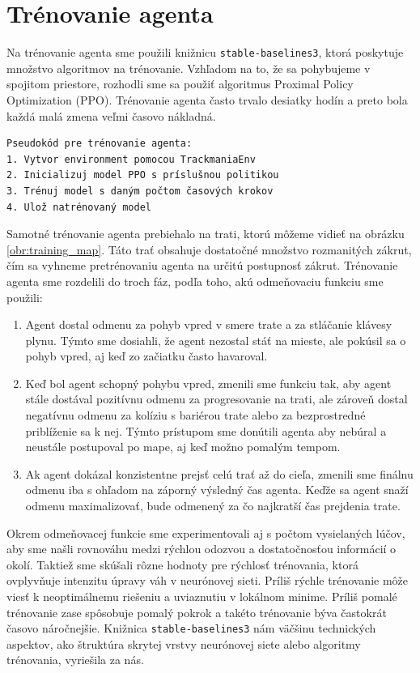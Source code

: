 \section{Trénovanie agenta}

Na trénovanie agenta sme použili knižnicu \texttt{stable-baselines3}\cite{stable_baselines3}, ktorá poskytuje množstvo algoritmov na trénovanie. Vzhľadom na to, že sa pohybujeme v spojitom priestore, rozhodli sme sa použiť algoritmus Proximal Policy Optimization (PPO). Trénovanie agenta často trvalo desiatky hodín a preto bola každá malá zmena veľmi časovo nákladná.
\newline

\begin{verbatim}
Pseudokód pre trénovanie agenta:
1. Vytvor environment pomocou TrackmaniaEnv
2. Inicializuj model PPO s príslušnou politikou
3. Trénuj model s daným počtom časových krokov
4. Ulož natrénovaný model
\end{verbatim}

Samotné trénovanie agenta prebiehalo na trati, ktorú môžeme vidieť na obrázku \ref{obr:training_map}. Táto trať obsahuje dostatočné množstvo rozmanitých zákrut, čím sa vyhneme pretrénovaniu agenta na určitú postupnosť zákrut. Trénovanie agenta sme rozdelili do troch fáz, podľa toho, akú odmeňovaciu funkciu sme použili:

\begin{enumerate}
    \item Agent dostal odmenu za pohyb vpred v smere trate a za stláčanie klávesy plynu. Týmto sme dosiahli, že agent nezostal stáť na mieste, ale pokúsil sa o pohyb vpred, aj keď zo začiatku často havaroval.
    \item Keď bol agent schopný pohybu vpred, zmenili sme funkciu tak, aby agent stále dostával pozitívnu odmenu za progresovanie na trati, ale zároveň dostal negatívnu odmenu za kolíziu s bariérou trate alebo za bezprostredné priblíženie sa k nej. Týmto prístupom sme donútili agenta aby nebúral a neustále postupoval po mape, aj keď možno pomalým tempom.
    \item Ak agent dokázal konzistentne prejsť celú trať až do cieľa, zmenili sme finálnu odmenu iba s ohľadom na záporný výsledný čas agenta. Keďže sa agent snaží odmenu maximalizovať, bude odmenený za čo najkratší čas prejdenia trate.
\end{enumerate}

Okrem odmeňovacej funkcie sme experimentovali aj s počtom vysielaných lúčov, aby sme našli rovnováhu medzi rýchlou odozvou a dostatočnosťou informácií o okolí. Taktiež sme skúšali rôzne hodnoty pre rýchlosť trénovania, ktorá ovplyvňuje intenzitu úpravy váh v neurónovej sieti. Príliš rýchle trénovanie môže viesť k neoptimálnemu riešeniu a uviaznutiu v lokálnom minime. Príliš pomalé trénovanie zase spôsobuje pomalý pokrok a takéto trénovanie býva častokrát časovo náročnejšie. Knižnica \texttt{stable-baselines3} nám väčšinu technických aspektov, ako štruktúra skrytej vrstvy neurónovej siete alebo algoritmy trénovania, vyriešila za nás.

